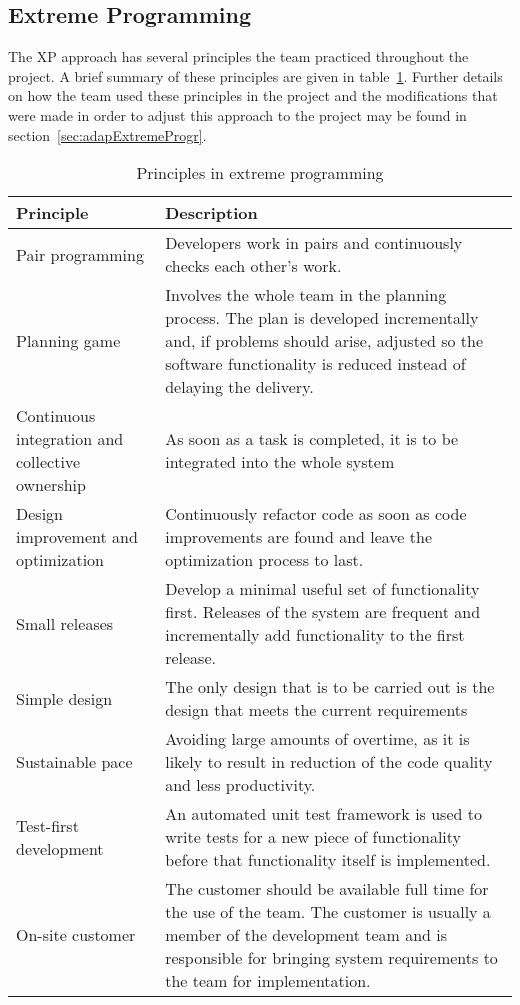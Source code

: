 \subsection{Extreme Programming}
The XP approach has several principles the team practiced throughout the project. A brief summary of these principles are given in table~\ref{tab:exProg}. Further details on how the team used these principles in the project and the modifications that were made in order to adjust this approach to the project may be found in section~\ref{sec:adapExtremeProgr}.

\begin{table}[H]
\begin{tabular}{|p{4cm}|p{11.7cm}|}
\hline
\textbf{Principle} & \textbf{Description} \\\hline
Pair programming & Developers work in pairs and continuously checks each other's work.\\\hline
Planning game & Involves the whole team in the planning process. The plan is developed incrementally and, if problems should arise, adjusted so the software functionality is reduced instead of delaying the delivery.
\\\hline
Continuous integration and collective ownership& As soon as a task is completed, it is to be integrated into the whole system\\\hline
Design improvement and optimization & Continuously refactor code as soon as code improvements are found and leave the optimization process to last. \\\hline
Small releases & Develop a minimal useful set of functionality first. Releases of the system are frequent and incrementally add functionality to the first release.\\\hline
Simple design & The only design that is to be carried out is the design that meets the current requirements\\\hline
Sustainable pace & Avoiding large amounts of overtime, as it is likely to result in reduction of the code quality and less productivity. \\\hline
Test-first development & An automated unit test framework is used to write tests for a new piece of functionality before that functionality itself is implemented. \\\hline
On-site customer & The customer should be available full time for the use of the team. The customer is usually a member of the development team and is responsible for bringing system requirements to the team for implementation.\\\hline
\end{tabular}
\caption{Principles in extreme programming}
\label{tab:exProg}
\end{table}